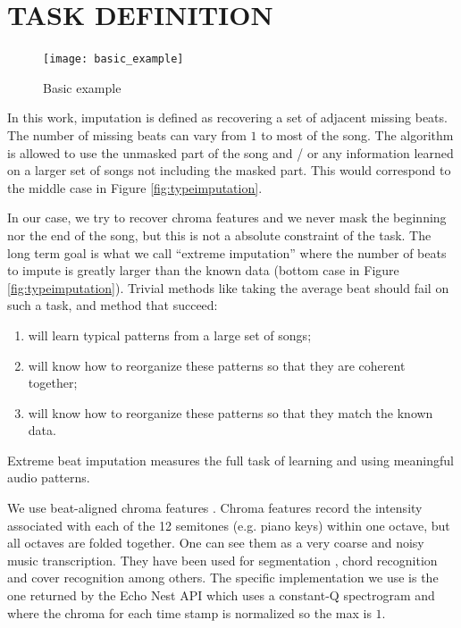 \documentclass{article}
\begin{document}
\section{TASK DEFINITION}
\label{sec:task}

\begin{figure}[t]
\begin{center}
\texttt{[image: basic\_example]}
\end{center}
\caption{Basic example}
\label{fig:code}
\end{figure}

In this work, imputation is defined as recovering a set of adjacent missing beats.
The number of missing beats can vary from $1$ to most of the song. The algorithm
is allowed to use the unmasked part of the song and / or any information learned
on a larger set of songs not including the masked part. This would correspond
to the middle case in Figure \ref{fig:typeimputation}.

In our case, we try to recover chroma features and we never mask the beginning
nor the end of the song, but this is not a absolute constraint of the task.
The long term goal is what we call ``extreme imputation'' where the number of
beats to impute is greatly larger than the known data (bottom case in
Figure \ref{fig:typeimputation}). Trivial methods like taking the average beat
should fail on such a task, and method that succeed:
\begin{enumerate}
\item will learn typical patterns from a large set of songs;
\item will know how to reorganize these patterns so that they are coherent together;
\item will know how to reorganize these patterns so that they match the known
data.
\end{enumerate}
Extreme beat imputation measures the full task of learning and using meaningful
audio patterns.

We use beat-aligned chroma features \cite{Ellis2007a}. 
Chroma features record the intensity associated with each of
the 12 semitones (e.g. piano keys) within one octave, but all octaves
are folded together.
One can see them as a very coarse and noisy music transcription.
They have been used for segmentation \cite{Weiss2010}, 
chord recognition \cite{Mauch2009} and cover recognition \cite{Ellis2007a}
among others. The specific implementation we use is the one returned
by the Echo Nest API \cite{EchoNest} which uses a constant-Q spectrogram
and where the chroma for each time stamp is normalized so the max is $1$.
\end{document}
